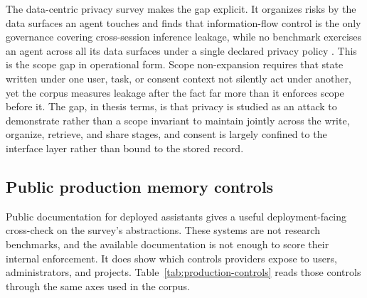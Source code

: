 The data-centric privacy survey makes the gap explicit. It organizes risks by the data surfaces an agent touches and finds that information-flow control is the only governance covering cross-session inference leakage, while no benchmark exercises an agent across all its data surfaces under a single declared privacy policy \citep{lahjouji2026privacysurvey}. This is the scope gap in operational form. Scope non-expansion requires that state written under one user, task, or consent context not silently act under another, yet the corpus measures leakage after the fact far more than it enforces scope before it. The gap, in thesis terms, is that privacy is studied as an attack to demonstrate rather than a scope invariant to maintain jointly across the write, organize, retrieve, and share stages, and consent is largely confined to the interface layer rather than bound to the stored record.

\subsection{Public production memory controls}

Public documentation for deployed assistants gives a useful deployment-facing cross-check on the survey's abstractions. These systems are not research benchmarks, and the available documentation is not enough to score their internal enforcement. It does show which controls providers expose to users, administrators, and projects. Table~\ref{tab:production-controls} reads those controls through the same axes used in the corpus.

